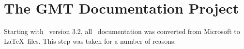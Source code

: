 





\chapter*{The GMT Documentation Project}

Starting with \GMT\ version 3.2, all \GMT\ documentation was
converted from Microsoft  to \LaTeX\ files.
This step was taken for a number of reasons:

